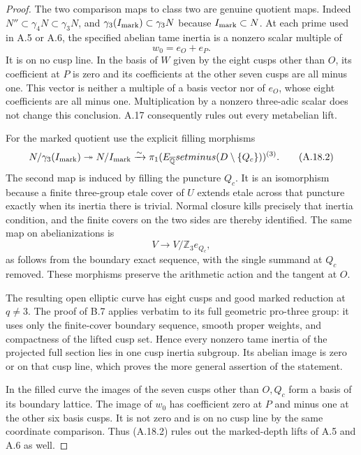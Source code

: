 \begin{proof}
The two comparison maps to class two are genuine quotient
maps. Indeed $N''\subset\gamma_4N\subset\gamma_3N$,
and $\gamma_3(I_{\rm mark})\subset\gamma_3N$ because
$I_{\rm mark}\subset N$.
At each prime used in A.5 or A.6, the specified abelian
tame inertia is a nonzero scalar multiple of
\[
 w_0=e_O+e_P.
\]
It is on no cusp line. In the basis of $W$ given by the
eight cusps other than $O$, its coefficient at $P$ is zero
and its coefficients at the other seven cusps are all
minus one. This vector is neither a multiple of a basis
vector nor of $e_O$, whose eight coefficients are all
minus one. Multiplication by a nonzero three-adic scalar
does not change this conclusion. A.17 consequently rules
out every metabelian lift.

For the marked quotient use the explicit filling morphisms
\[
 N/\gamma_3(I_{\rm mark})\twoheadrightarrow N/I_{\rm mark}
 \xrightarrow{\sim}
 \pi_1(E_{\overline{\mathbb Q}}setminus
                    (D\setminus\{Q_c\}))^{(3)}.
 \tag{A.18.2}
\]
The second map is induced by filling the puncture $Q_c$.
It is an isomorphism because a finite three-group etale
cover of $U$ extends etale across that puncture exactly
when its inertia there is trivial. Normal closure kills
precisely that inertia condition, and the finite covers
on the two sides are thereby identified. The same map
on abelianizations is
\[
 V\longrightarrow V/\mathbb Z_3e_{Q_c},
\]
as follows from the boundary exact sequence, with the
single summand at $Q_c$ removed. These morphisms preserve
the arithmetic action and the tangent at $O$.

The resulting open elliptic curve has eight cusps and good
marked reduction at $q\ne3$. The proof of B.7 applies
verbatim to its full geometric pro-three group: it uses
only the finite-cover boundary sequence, smooth proper
weights, and compactness of the lifted cusp set. Hence
every nonzero tame inertia of the projected full section
lies in one cusp inertia subgroup. Its abelian image is
zero or on that cusp line, which proves the more general
assertion of the statement.

In the filled curve the images of the seven cusps other
than $O,Q_c$ form a basis of its boundary lattice. The
image of $w_0$ has coefficient zero at $P$ and minus one
at the other six basis cusps. It is not zero and is on no
cusp line by the same coordinate comparison. Thus (A.18.2)
rules out the marked-depth lifts of A.5 and A.6 as well.


\end{proof}
